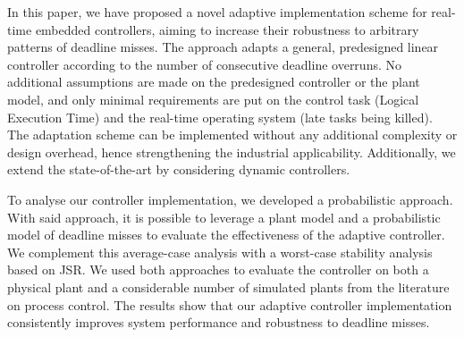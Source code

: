 In this paper, we have proposed a novel adaptive implementation scheme for real-time embedded controllers, aiming to increase their robustness to arbitrary patterns of deadline misses. 
The approach adapts a general, predesigned linear controller according to the number of consecutive deadline overruns.
No additional assumptions are made on the predesigned controller or the plant model, and only minimal requirements are put on the control task (Logical Execution Time) and the real-time operating system (late tasks being killed).
The adaptation scheme can be implemented without any additional complexity or design overhead, hence strengthening the industrial applicability.
Additionally, we extend the state-of-the-art by considering dynamic controllers.

To analyse our controller implementation, we developed a probabilistic approach.
With said approach, it is possible to leverage a plant model and a probabilistic model of deadline misses to evaluate the effectiveness of the adaptive controller.
We complement this average-case analysis with a worst-case stability analysis based on JSR.
We used both approaches to evaluate the controller on both a physical plant and a considerable number of simulated plants from the literature on process control.
The results show that our adaptive controller implementation consistently improves system performance and robustness to deadline misses.
